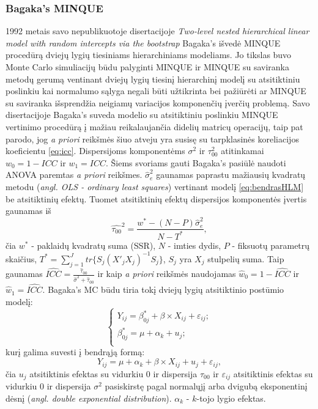 \documentclass[12pt,a4paper]{article}
\begin{document}
\subsubsection{Bagaka's MINQUE}
1992 metais savo nepublikuotoje disertacijoje \textit{Two-level nested hierarchical linear model with random intercepts via the bootstrap}\cite{bagaka} Bagaka's išvedė MINQUE procedūrą dviejų lygių tiesiniams hierarchiniams modeliams. Jo tikslas buvo Monte Carlo simuliacijų būdu palyginti MINQUE ir MINQUE su saviranka metodų gerumą ventinant dviejų lygių tiesinį hierarchinį modelį su atsitiktiniu poslinkiu kai normalumo sąlyga negali būti užtikrinta bei pažiūrėti ar MINQUE su saviranka išsprendžia neigiamų variacijos komponenčių įverčių problemą. Savo disertacijoje Bagaka's suveda modelio su atsitiktiniu poslinkiu MINQUE vertinimo procedūrą į mažiau reikalaujančia didelių matricų operacijų, taip pat parodo, jog \textit{a priori} reikšmės šiuo atveju yra susisę su tarpklasinės koreliacijos koeficientu \ref{eq:icc}. Dispersijoms komponentėms $\sigma^2$ ir $\tau_{00}^2$ atitinkamai $w_0=1-ICC$ ir $w_1=ICC$.
\indent Šiems svoriams gauti Bagaka's pasiūlė naudoti ANOVA paremtas \textit{a priori} reikšmes. $\hat{\sigma}^2_{e}$ gaunamas paprastu mažiausių kvadratų metodu (\textit{angl. OLS - ordinary least squares}) vertinant modelį \ref{eq:bendrasHLM} be atsitiktinių efektų. Tuomet atsitiktinių efektų dispersijos komponentės įvertis gaunamas iš
\[
\hat{\tau_{00}}^2=\frac{w^*-(N-P)\hat{\sigma}_e^2}{N-T^*},
\]
čia $w^*$ - paklaidų kvadratų suma (SSR), $N$ - imties dydis, $P$ - fiksuotų parametrų skaičius, $T^*=\sum_{j=1}^J tr\{S_j(X'_jX_j)^{-1}S_j\}$, $S_j$ yra $X_j$ stulpelių suma. Taip gaunamas $\widehat{ICC} = \frac{\hat{\tau}_{00}}{\hat{\sigma}^2+\hat{\tau}_{00}}$ ir kaip \textit{a priori} reikšmės naudojamas $\hat{w}_0=1-\widehat{ICC}$ ir $\hat{w}_1=\widehat{ICC}$.
\indent Bagaka's MC būdu tiria tokį dviejų lygių atsitiktinio postūmio modelį:
\begin{equation}\label{eq:beqa}
\left\{
\begin{array}{l}
Y_{ij} = \beta^*_{0j}+ \beta \times X_{ij}+\varepsilon_{ij}; \\
\beta^*_{0j} = \mu+\alpha_k+u_{j};\\
\end{array} \right. 
\end{equation}
kurį galima suvesti į bendrąją formą:
\begin{equation}\label{eq:beq}
Y_{ij}=\mu+\alpha_k+\beta\times X_{ij}+u_j+\varepsilon_{ij}, 
\end{equation}
čia $u_j$ atsitiktinis efektas su vidurkiu 0 ir dispersija $\tau_00$ ir $\varepsilon_{ij}$ atsitiktinis efektas su vidurkiu 0 ir dispersija $\sigma^2$ pasiskirstę pagal normalųjį arba dvigubą eksponentinį dėsnį (\textit{angl. double exponential distribution}). $\alpha_k$ - $k$-tojo lygio efektas.
\end{document}
